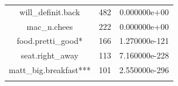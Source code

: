 \documentclass[12pt,twoside]{dukestatscithesis}
\theoremstyle{definition}
\theoremstyle{definition}
\theoremstyle{definition}
\theoremstyle{remark}
\begin{document}
\begin{longtable}[]{@{}ccc@{}}
\begin{minipage}[t]{0.31\columnwidth}\centering\strut
will\_definit.back\strut
\end{minipage} & \begin{minipage}[t]{0.44\columnwidth}\centering\strut
482\strut
\end{minipage} & \begin{minipage}[t]{0.17\columnwidth}\centering\strut
0.000000e+00\strut
\end{minipage}\tabularnewline
\begin{minipage}[t]{0.31\columnwidth}\centering\strut
mac\_n.chees\strut
\end{minipage} & \begin{minipage}[t]{0.44\columnwidth}\centering\strut
222\strut
\end{minipage} & \begin{minipage}[t]{0.17\columnwidth}\centering\strut
0.000000e+00\strut
\end{minipage}\tabularnewline
\begin{minipage}[t]{0.31\columnwidth}\centering\strut
food.pretti\_good*\strut
\end{minipage} & \begin{minipage}[t]{0.44\columnwidth}\centering\strut
166\strut
\end{minipage} & \begin{minipage}[t]{0.17\columnwidth}\centering\strut
1.270000e-121\strut
\end{minipage}\tabularnewline
\begin{minipage}[t]{0.31\columnwidth}\centering\strut
seat.right\_away\strut
\end{minipage} & \begin{minipage}[t]{0.44\columnwidth}\centering\strut
113\strut
\end{minipage} & \begin{minipage}[t]{0.17\columnwidth}\centering\strut
7.160000e-228\strut
\end{minipage}\tabularnewline
\begin{minipage}[t]{0.31\columnwidth}\centering\strut
matt\_big.breakfast***\strut
\end{minipage} & \begin{minipage}[t]{0.44\columnwidth}\centering\strut
101\strut
\end{minipage} & \begin{minipage}[t]{0.17\columnwidth}\centering\strut
2.550000e-296\strut
\end{minipage}\tabularnewline
\begin{minipage}[t]{0.31\columnwidth}\centering\strut

\end{minipage}
\end{longtable}
\end{document}
